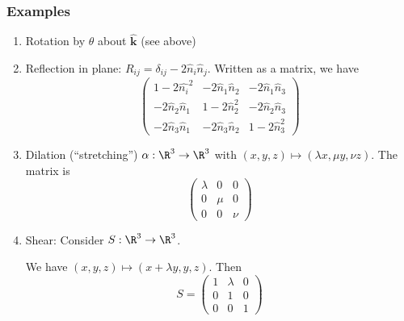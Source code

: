 \documentclass[a4paper]{article}
\begin{document}
\subsubsection{Examples}
\begin{enumerate}
  \item Rotation by $\theta$ about $\mathbf{\hat k}$ (see above)
  \item Reflection in plane: $R_{ij} = \delta_{ij} - 2\hat n_i\hat n_j$. Written as a matrix, we have
    \[
      \begin{pmatrix}
        1 - 2\hat{n_i}^2 & -2\hat n_1\hat n_2 & -2\hat n_1\hat n_3\\
        -2\hat n_2\hat n_1 & 1 - 2\hat n_2^2 & -2\hat n_2\hat n_3\\
        -2\hat n_3\hat n_1 & -2\hat n_3\hat n_2 & 1 - 2\hat n_3^2
      \end{pmatrix}
    \]
  \item Dilation (``stretching'') $\alpha: \R^3 \to \R^3$ with $(x, y, z)\mapsto (\lambda x, \mu y, \nu z)$. The matrix is
    \[
      \begin{pmatrix}
        \lambda & 0 & 0\\
        0 & \mu & 0\\
        0 & 0 & \nu
      \end{pmatrix}
    \]
  \item Shear: Consider $S:\R^3 \to \R^3$.

    \begin{center}
    \end{center}

    We have $(x, y, z)\mapsto (x + \lambda y, y, z)$. Then
    \[
      S =
      \begin{pmatrix}
        1 & \lambda & 0\\
        0 & 1 & 0\\
        0 & 0 & 1
      \end{pmatrix}
    \]
\end{enumerate}
\end{document}
